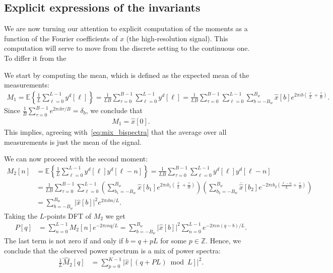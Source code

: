 \documentclass[english,12pt]{article}
\newcommand{\I}{\iota}
\newcommand{\tB}{B_w}
\newcommand{\hx}{\hat{x}}
\newcommand{\E}{\mathbb{E}}
\numberwithin{equation}{section}
\numberwithin{mytheorem}{section} %
\begin{document}
\subsection{Explicit expressions of the invariants}

We are now turning our attention to explicit computation of the moments as a function of the Fourier coefficients of $x$ (the high-resolution signal). This computation will serve to move from the discrete setting to the continuous one. To differ it from the  

We start by computing the mean, which is defined as the expected mean of the measurements: 
\begin{equation}
\begin{split}
M_1 = \E\left\{ \frac{1}{L} \sum_{\ell=0}^{L-1} y^d[\ell]\right\} =  \frac{1}{LB}\sum_{\tau=0}^{B-1}\sum_{\ell=0}^{L-1} y^d[\ell] =  \frac{1}{LB}\sum_{\tau=0}^{B-1}\sum_{\ell=0}^{L-1}
\sum_{b=-\tB}^{\tB}\hat{x}[b]e^{2\pi\I b \left(\frac{\ell}{L} + \frac{\tau}{B}\right) }.
\end{split}
\end{equation}
Since $\frac{1}{B}\sum_{\tau=0}^{B-1}e^{2\pi\I b \tau/B}=\delta_b$, we conclude that 
\begin{equation} \label{eq:mean}
\begin{split}
M_1 = \hx[0].
\end{split}
\end{equation}
This  implies, agreeing with~\eqref{eq:mix_bispectra} that the average over all measurements is just the mean of the signal.  

We can now proceed with the second moment:
\begin{equation} \label{eq:ps}
\begin{split}
M_2[n] &= \E\left\{\frac{1}{L}\sum_{\ell=0}^{L-1} y^d[\ell]y^d[\ell-n]\right\} =  \frac{1}{LB}\sum_{\tau=0}^{B-1}\sum_{\ell=0}^{L-1} y^d[\ell]y^d[\ell-n] \\ &=  \frac{1}{LB}\sum_{\tau=0}^{B-1}\sum_{\ell=0}^{L-1}
\left(\sum_{b_1=-\tB}^{\tB}\hat{x}[b_1]e^{2\pi\I b_1 \left(\frac{\ell}{L} + \frac{\tau}{B}\right)} \right)
\left(\sum_{b_2=-\tB}^{\tB}\overline{\hx}[b_2]e^{-2\pi\I b_2 \left(\frac{\ell-n}{L} + \frac{\tau}{B}\right)} \right) \\
&=
\sum_{b=-\tB}^{\tB}\vert \hat{x}[b]\vert ^2e^{2\pi\I bn/L}.
\end{split}
\end{equation}
Taking the $L$-points DFT of $M_2$ we get 
\begin{equation}
\begin{split}
P[q] &= \sum_{n=0}^{L-1}M_2[n]e^{-2\pi\I nq/L} = \sum_{b=-\tB}^{\tB}\vert \hat{x}[b]\vert^2\sum_{n=0}^{L-1}e^{-2\pi\I n(q-b)/L}.
\end{split}
\end{equation}
The last term is not zero if and only if $b = q + pL$ for some $p\in\mathbb{Z}$.  Hence, we conclude that the observed power spectrum is a mix of power spectra:
\begin{equation}
\begin{split}
\frac{1}{L}\hat{M}_2[q] &=  \sum_{p=0}^{K-1} \vert \hat{x}[(q+PL)\bmod L]\vert^2.
\end{split}
\end{equation}
\end{document}
